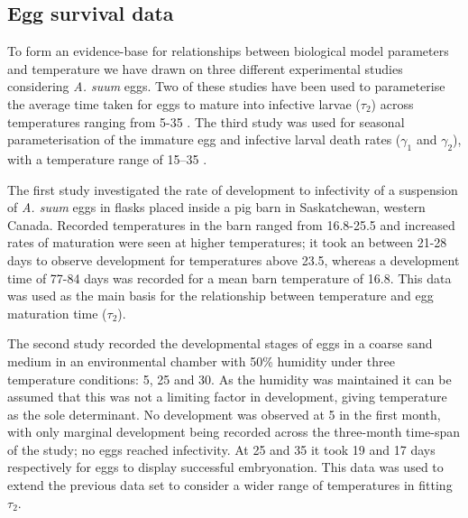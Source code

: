 
\subsection{Egg survival data}

To form an evidence-base for relationships between biological model parameters and temperature we have drawn on three different experimental studies considering \textit{A. suum} eggs. Two of these studies have been used to parameterise the average time taken for eggs to mature into infective larvae ($\tau_2$) across temperatures ranging from 5-35 \cite{Wagner,Kim}. The third study was used for seasonal parameterisation of the immature egg and infective larval death rates ($\gamma_1$ and $\gamma_2$), with a temperature range of 15--35 \cite{Arene}.

The first study \cite{Wagner} investigated the rate of development to infectivity of a suspension of \textit{A. suum} eggs in flasks placed inside a pig barn in Saskatchewan, western Canada. Recorded temperatures in the barn ranged from 16.8-25.5 and increased rates of maturation were seen at higher temperatures; it took an between 21-28 days to observe development for temperatures above 23.5, whereas a development time of 77-84 days was recorded for a mean barn temperature of 16.8. This data was used as the main basis for the relationship between temperature and egg maturation time ($\tau_2$).

The second study \cite{Kim} recorded the developmental stages of eggs in a coarse sand medium in an environmental chamber with 50\% humidity under three temperature conditions: 5, 25 and 30. As the humidity was maintained it can be assumed that this was not a limiting factor in development, giving temperature as the sole determinant. No development was observed at 5 in the first month, with only marginal development being recorded across the three-month time-span of the study; no eggs reached infectivity. At 25 and 35 it took 19 and 17 days respectively for eggs to display successful embryonation. This data was used to extend the previous data set to consider a wider range of temperatures in fitting $\tau_2$.


